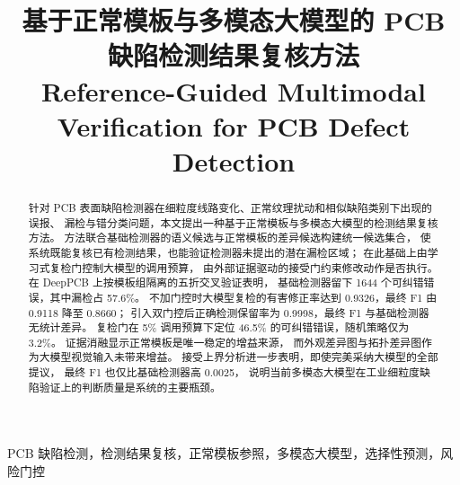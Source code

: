 \documentclass[conference]{IEEEtran}
\title{基于正常模板与多模态大模型的 PCB 缺陷检测结果复核方法\\
{\large Reference-Guided Multimodal Verification for PCB Defect Detection}}
\author{\IEEEauthorblockN{匿名作者}}
\begin{document}
\maketitle

\begin{abstract}
针对 PCB 表面缺陷检测器在细粒度线路变化、正常纹理扰动和相似缺陷类别下出现的误报、
漏检与错分类问题，本文提出一种基于正常模板与多模态大模型的检测结果复核方法。
方法联合基础检测器的语义候选与正常模板的差异候选构建统一候选集合，
使系统既能复核已有检测结果，也能验证检测器未提出的潜在漏检区域；
在此基础上由学习式复检门控制大模型的调用预算，
由外部证据驱动的接受门约束修改动作是否执行。
在 DeepPCB 上按模板组隔离的五折交叉验证表明，
基础检测器留下 1644 个可纠错错误，其中漏检占 57.6\%。
不加门控时大模型复检的有害修正率达到 0.9326，最终 F1 由 0.9118 降至 0.8660；
引入双门控后正确检测保留率为 0.9998，最终 F1 与基础检测器无统计差异。
复检门在 5\% 调用预算下定位 46.5\% 的可纠错错误，随机策略仅为 3.2\%。
证据消融显示正常模板是唯一稳定的增益来源，
而外观差异图与拓扑差异图作为大模型视觉输入未带来增益。
接受上界分析进一步表明，即使完美采纳大模型的全部提议，
最终 F1 也仅比基础检测器高 0.0025，
说明当前多模态大模型在工业细粒度缺陷验证上的判断质量是系统的主要瓶颈。
\end{abstract}

\begin{IEEEkeywords}
PCB 缺陷检测，检测结果复核，正常模板参照，多模态大模型，选择性预测，风险门控
\end{IEEEkeywords}











\end{document}
